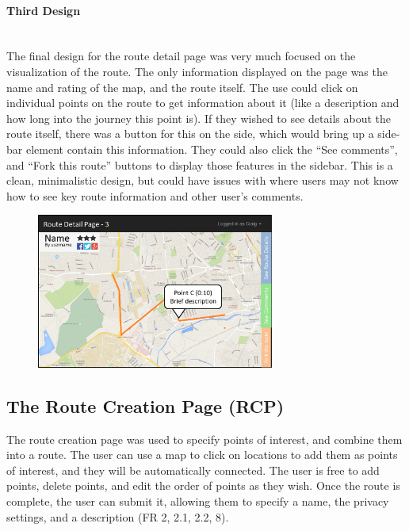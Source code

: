 \documentclass[a4paper,twoside,notitlepage,11pt]{article}
\begin{document}
\paragraph{Third Design}\ \\
The final design for the route detail page was very much focused on the visualization of the route. The only information displayed on the page was the name and rating of the map, and the route itself. The use could click on individual points on the route to get information about it (like a description and how long into the journey this point is). If they wished to see details about the route itself, there was a button for this on the side, which would bring up a side-bar element contain this information. They could also click the ``See comments'', and ``Fork this route'' buttons to display those features in the sidebar. This is a clean, minimalistic design, but could have issues with where users may not know how to see key route information and other user's comments.
\begin{figure}[!ht]
	\begin{center}
		\includegraphics[width=0.7\textwidth]{images/ui-detail-3.png}
	\end{center}
	\vspace{-6mm}
\end{figure}

\subsection{The Route Creation Page (RCP)}
The route creation page was used to specify points of interest, and combine them into a route. The user can use a map to click on locations to add them as points of interest, and they will be automatically connected. The user is free to add points, delete points, and edit the order of points as they wish. Once the route is complete, the user can submit it, allowing them to specify a name, the privacy settings, and a description (FR 2, 2.1, 2.2, 8).
\end{document}
